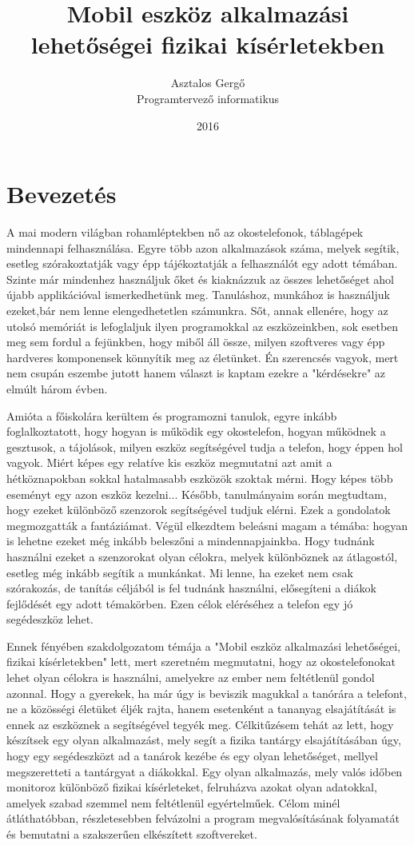 \documentclass{thesis-ekf}
\institute{Eszterházy Károly Főiskola\\ Matematikai és Informatikai Intézet}
\title{Mobil eszköz alkalmazási lehetőségei fizikai kísérletekben}
\author{Asztalos Gergő\\ Programtervező informatikus}
\date{2016}
\theoremstyle{definition}
\theoremstyle{remark}
\begin{document}
\maketitle
\tableofcontents

\chapter*{Bevezetés}
A mai modern világban rohamléptekben nő az okostelefonok, táblagépek mindennapi felhasználása. Egyre több azon alkalmazások száma, melyek segítik, esetleg szórakoztatják vagy épp tájékoztatják a felhasználót egy adott témában. 
Szinte már mindenhez használjuk őket és kiaknázzuk az összes lehetőséget ahol újabb applikációval ismerkedhetünk meg.
Tanuláshoz, munkához is használjuk ezeket,bár nem lenne elengedhetetlen számunkra.
Sőt, annak ellenére, hogy az utolsó memóriát is lefoglaljuk ilyen programokkal az eszközeinkben, sok esetben meg sem fordul a fejünkben, hogy miből áll össze, milyen szoftveres vagy épp hardveres komponensek könnyítik meg az életünket. Én szerencsés vagyok, mert nem csupán eszembe jutott hanem választ is kaptam ezekre a "kérdésekre" az elmúlt három évben.
\par Amióta a főiskolára kerültem és programozni tanulok, egyre inkább foglalkoztatott, hogy hogyan is működik egy okostelefon, hogyan működnek a gesztusok, a tájolások, milyen eszköz segítségével tudja a telefon, hogy éppen hol vagyok. Miért képes egy relatíve kis eszköz megmutatni azt amit a hétköznapokban sokkal hatalmasabb eszközök szoktak mérni. Hogy képes több eseményt egy azon eszköz kezelni...
Később, tanulmányaim során megtudtam, hogy ezeket különböző szenzorok segítségével tudjuk elérni. 
Ezek a gondolatok megmozgatták a fantáziámat. Végül elkezdtem beleásni magam a témába: hogyan is lehetne ezeket még inkább beleszőni a mindennapjainkba. Hogy tudnánk használni ezeket a szenzorokat olyan célokra, melyek különböznek az átlagostól, esetleg még inkább segítik a munkánkat. Mi lenne, ha ezeket nem csak szórakozás, de tanítás céljából is fel tudnánk használni, elősegíteni a diákok fejlődését egy adott témakörben. Ezen célok eléréséhez a telefon egy jó segédeszköz lehet.
\par Ennek fényében szakdolgozatom témája a "Mobil eszköz alkalmazási lehetőségei, fizikai kísérletekben" lett, mert szeretném megmutatni, hogy az okostelefonokat lehet olyan célokra is használni, amelyekre az ember nem feltétlenül gondol azonnal. Hogy a gyerekek, ha már úgy is beviszik magukkal a tanórára a telefont, ne a közösségi életüket éljék rajta, hanem esetenként a tananyag elsajátítását is ennek az eszköznek a segítségével tegyék meg. Célkitűzésem tehát az lett, hogy készítsek egy olyan alkalmazást, mely segít a fizika tantárgy elsajátításában úgy, hogy egy segédeszközt ad a tanárok kezébe és egy olyan lehetőséget, mellyel megszeretteti a tantárgyat a diákokkal. Egy olyan alkalmazás, mely valós időben monitoroz különböző fizikai kísérleteket, felruházva azokat olyan adatokkal, amelyek szabad szemmel nem feltétlenül egyértelműek. Célom minél átláthatóbban, részletesebben felvázolni a program megvalósításának folyamatát és bemutatni a szakszerűen elkészített szoftvereket.
\end{document}
